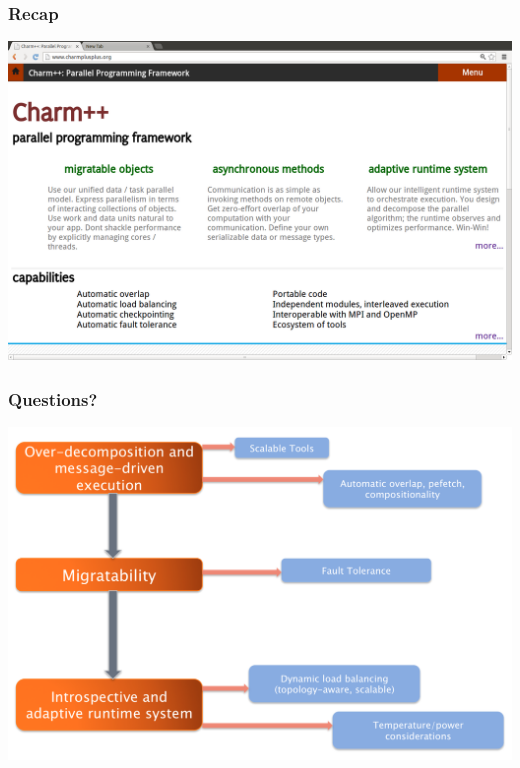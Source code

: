 \begin{frame}
\frametitle{Recap}
\includegraphics[width=\textwidth]{../figures/charmwebsite-screenshot.png}
\end{frame}


\begin{frame}
\frametitle{Questions?}
\includegraphics[width=\textwidth]{../figures/charmOutline.png}
\end{frame}
